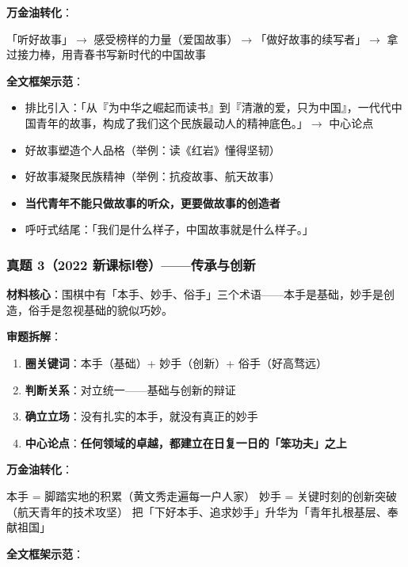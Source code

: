 \textbf{万金油转化}：

「听好故事」$\to$ 感受榜样的力量（爱国故事）$\to$「做好故事的续写者」$\to$ 拿过接力棒，用青春书写新时代的中国故事

\textbf{全文框架示范}：

\begin{itemize}
  \item[\textbf{开头}] 排比引入：「从『为中华之崛起而读书』到『清澈的爱，只为中国』，一代代中国青年的故事，构成了我们这个民族最动人的精神底色。」$\to$ 中心论点
  \item[\textbf{分论点 1}] 好故事塑造个人品格（举例：读《红岩》懂得坚韧）
  \item[\textbf{分论点 2}] 好故事凝聚民族精神（举例：抗疫故事、航天故事）
  \item[\textbf{分论点 3}] \textbf{当代青年不能只做故事的听众，更要做故事的创造者}
  \item[\textbf{结尾}] 呼吁式结尾：「我们是什么样子，中国故事就是什么样子。」
\end{itemize}

\subsubsection{真题 3（2022 新课标Ⅰ卷）——传承与创新}

\textbf{材料核心}：围棋中有「本手、妙手、俗手」三个术语——本手是基础，妙手是创造，俗手是忽视基础的貌似巧妙。

\textbf{审题拆解}：

\begin{enumerate}
  \item \textbf{圈关键词}：本手（基础）+ 妙手（创新）+ 俗手（好高骛远）
  \item \textbf{判断关系}：对立统一——基础与创新的辩证
  \item \textbf{确立立场}：没有扎实的本手，就没有真正的妙手
  \item \textbf{中心论点}：\textbf{任何领域的卓越，都建立在日复一日的「笨功夫」之上}
\end{enumerate}

\textbf{万金油转化}：

本手 = 脚踏实地的积累（黄文秀走遍每一户人家）
妙手 = 关键时刻的创新突破（航天青年的技术攻坚）
把「下好本手、追求妙手」升华为「青年扎根基层、奉献祖国」

\textbf{全文框架示范}：

